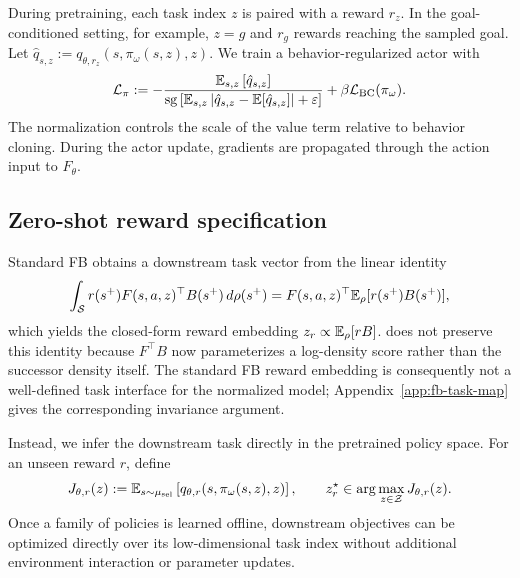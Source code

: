 During pretraining, each task index $z$ is paired with a reward $r_z$. 
In the goal-conditioned setting, for example, $z=g$ and $r_g$ rewards reaching the sampled goal. 
Let $\hat q_{s,z}:=q_{\theta,r_z}(s,\pi_\omega(s,z),z)$. We train a behavior-regularized actor with
\begin{equation}
    \mathcal L_{\pi} := -\frac{\mathbb{E}_{s,z}\left[\hat q_{s,z}\right]}{\mathrm{sg}\left[\mathbb{E}_{s,z}\left|\hat q_{s,z}-\mathbb{E}[\hat q_{s,z}]\right|+\varepsilon\right]}+\beta\mathcal L_{\mathrm{BC}}(\pi_\omega).
    \label{eq:actor-loss}
\end{equation}
The normalization controls the scale of the value term relative to behavior cloning. 
During the actor update, gradients are propagated through the action input to $F_\theta$.

\subsection{Zero-shot reward specification}
\label{sec:method-task-interface}

Standard FB obtains a downstream task vector from the linear identity
\begin{equation}
    \int_{\mathcal S} r(s^+)F(s,a,z)^\top B(s^+)\,d\rho(s^+) = F(s,a,z)^\top\mathbb{E}_\rho[r(s^+)B(s^+)],
    \label{eq:fb-linear-identity}
\end{equation}
which yields the closed-form reward embedding $z_r\propto\mathbb{E}_\rho[rB]$.
\name{} does not preserve this identity because $F^\top B$ now parameterizes a log-density score rather than the successor density itself.
The standard FB reward embedding is consequently not a well-defined task interface for the normalized model; Appendix~\ref{app:fb-task-map} gives the
corresponding invariance argument.

Instead, we infer the downstream task directly in the pretrained policy space. 
For an unseen reward $r$, define
\begin{equation}
    J_{\theta,r}(z) := \mathbb{E}_{s\sim\mu_{\mathrm{sel}}} \left[ q_{\theta,r}(s,\pi_\omega(s,z),z) \right], \qquad z_r^\star \in \arg\max_{z\in\mathcal Z} J_{\theta,r}(z).
    \label{eq:policy-search}
\end{equation}
Once a family of policies is learned offline, downstream objectives can be optimized directly over its low-dimensional task index without additional environment interaction or parameter updates.

